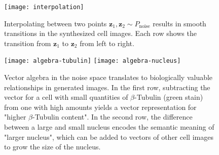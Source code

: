 \documentclass{article}
\begin{document}
\begin{figure}
  \centering
  \texttt{[image: interpolation]}
  \caption{Interpolating between two points $\mathbf{z}_1, \mathbf{z}_2 \sim P_{\text{noise}}$ results in smooth transitions in the synthesized cell images. Each row shows the transition from $\mathbf{z}_1$ to $\mathbf{z}_2$ from left to right.}
  \label{fig:interpolations}
\end{figure}

\begin{figure}
  \centering
  \texttt{[image: algebra-tubulin]}
  \texttt{[image: algebra-nucleus]}
  \caption{Vector algebra in the noise space translates to biologically valuable relationships in generated images. In the first row, subtracting the vector for a cell with small quantities of $\beta$-Tubulin (green stain) from one with high amounts yields a vector representation for "higher $\beta$-Tubulin content". In the second row, the difference between a large and small nucleus encodes the semantic meaning of "larger nucleus", which can be added to vectors of other cell images to grow the size of the nucleus.}
  \label{fig:algebra}
\end{figure}
\end{document}
